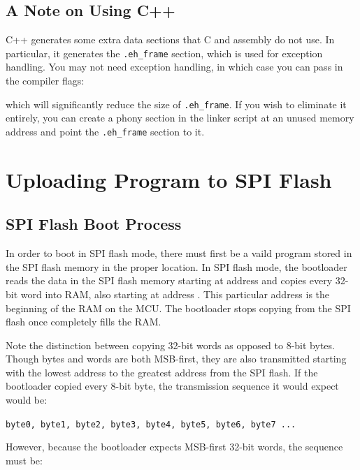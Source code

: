 \documentclass[11pt,pdftex,portrait,letterpaper]{article}
\begin{document}
\subsection{A Note on Using C++}
C++ generates some extra data sections that C and assembly do not use. In particular, it generates the \texttt{.eh\_frame} section, which is used for exception handling. You may not need exception handling, in which case you can pass in the compiler flags:

\noindent{}

\noindent which will significantly reduce the size of \texttt{.eh\_frame}. If you wish to eliminate it entirely, you can create a phony section in the linker script at an unused memory address and point the \texttt{.eh\_frame} section to it.

\newpage



\section{Uploading Program to SPI Flash} \label{s:programming}

\subsection{SPI Flash Boot Process}
In order to boot in SPI flash mode, there must first be a vaild program stored in the SPI flash memory in the proper location. In SPI flash mode, the bootloader reads the data in the SPI flash memory starting at address \texttt{\SpiFlashProgramAddress} and copies every 32-bit word into RAM, also starting at address \texttt{\RamStartAddress}. This particular address is the beginning of the RAM on the MCU. The bootloader stops copying from the SPI flash once completely fills the RAM.

Note the distinction between copying 32-bit words as opposed to 8-bit bytes. Though bytes and words are both MSB-first, they are also transmitted starting with the lowest address to the greatest address from the SPI flash. If the bootloader copied every 8-bit byte, the transmission sequence it would expect would be:

\noindent\texttt{byte0, byte1, byte2, byte3, byte4, byte5, byte6, byte7 ...}

\noindent However, because the bootloader expects MSB-first 32-bit words, the sequence must be:
\end{document}
